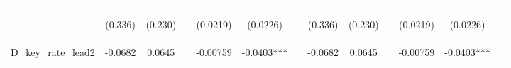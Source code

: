 \documentclass[]{article}
\begin{document}
\begin{center}
\begin{tabular}{lcccccccccccc}
\vspace{4pt} & \begin{footnotesize}(0.336)\end{footnotesize} & \begin{footnotesize}(0.230)\end{footnotesize} & \begin{footnotesize}\end{footnotesize} & \begin{footnotesize}(0.0219)\end{footnotesize} & \begin{footnotesize}(0.0226)\end{footnotesize} & \begin{footnotesize}\end{footnotesize} & \begin{footnotesize}(0.336)\end{footnotesize} & \begin{footnotesize}(0.230)\end{footnotesize} & \begin{footnotesize}\end{footnotesize} & \begin{footnotesize}(0.0219)\end{footnotesize} & \begin{footnotesize}(0.0226)\end{footnotesize} & \begin{footnotesize}\end{footnotesize} \\
D\_key\_rate\_lead2 & -0.0682 & 0.0645 &  & -0.00759 & -0.0403*** &  & -0.0682 & 0.0645 &  & -0.00759 & -0.0403*** &  \\

\end{tabular}
\end{center}
\end{document}
